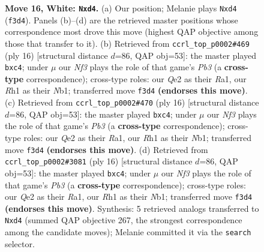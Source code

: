 \documentclass[11pt]{article}
\begin{document}
\begin{figure}[p]
\caption{\textbf{Move 16, White: \texttt{Nxd4}.} (a) Our position; Melanie plays \texttt{Nxd4} (\texttt{f3d4}). Panels (b)--(d) are the retrieved master positions whose correspondence most drove this move (highest QAP objective among those that transfer to it). (b) Retrieved from \texttt{ccrl\_top\_p0002\#469} (ply 16) [structural distance $d$=86, QAP obj=53]: the master played \texttt{bxc4}; under $\mu$ our \emph{Nf3} plays the role of that game's \emph{Pb3} (a \textbf{cross-type} correspondence); cross-type roles: our \emph{Q}e2 as their \emph{R}a1, our \emph{R}h1 as their \emph{N}b1; transferred move \texttt{f3d4} \textbf{(endorses this move)}. (c) Retrieved from \texttt{ccrl\_top\_p0002\#470} (ply 16) [structural distance $d$=86, QAP obj=53]: the master played \texttt{bxc4}; under $\mu$ our \emph{Nf3} plays the role of that game's \emph{Pb3} (a \textbf{cross-type} correspondence); cross-type roles: our \emph{Q}e2 as their \emph{R}a1, our \emph{R}h1 as their \emph{N}b1; transferred move \texttt{f3d4} \textbf{(endorses this move)}. (d) Retrieved from \texttt{ccrl\_top\_p0002\#3081} (ply 16) [structural distance $d$=86, QAP obj=53]: the master played \texttt{bxc4}; under $\mu$ our \emph{Nf3} plays the role of that game's \emph{Pb3} (a \textbf{cross-type} correspondence); cross-type roles: our \emph{Q}e2 as their \emph{R}a1, our \emph{R}h1 as their \emph{N}b1; transferred move \texttt{f3d4} \textbf{(endorses this move)}. Synthesis: 5 retrieved analogs transferred to \texttt{Nxd4} (summed QAP objective 267, the strongest correspondence among the candidate moves); Melanie committed it via the \texttt{search} selector.}
\label{fig:thought-m30}
\end{figure}

\clearpage
\end{document}
